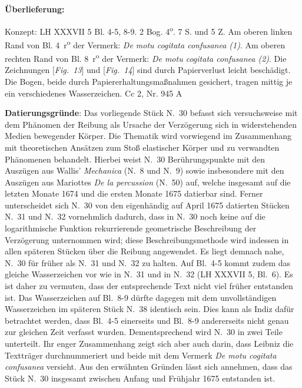 \begin{ledgroupsized}[r]{120mm}
\footnotesize
\pstart
\noindent\textbf{\"{U}berlieferung:}   
\pend
\end{ledgroupsized}
\begin{ledgroupsized}[r]{114mm}
\footnotesize
\pstart
\parindent -6mm
Konzept: LH XXXVII 5 Bl. 4-5, 8-9.
2 Bog. 4\textsuperscript{o}.
7 S. und 5 Z.
Am oberen linken Rand von Bl. 4~r\textsuperscript{o} der Vermerk: \textit{De motu cogitata confusanea (1)}.
Am oberen rechten Rand von Bl. 8~r\textsuperscript{o} der Vermerk: \textit{De motu cogitata confusanea (2)}.
Die Zeichnungen [\textit{Fig.~13}] und [\textit{Fig.~14}] sind durch Papierverlust leicht besch\"{a}digt.
Die Bogen, beide durch Papier\-er\-haltungsma{\ss}nahmen gesichert, tragen mittig je ein verschiedenes Wasserzeichen.%
\newline%
Cc 2, Nr. 945 A%
\pend
\end{ledgroupsized}

\vspace*{5mm}
\begin{ledgroup}
\footnotesize 
\pstart
\noindent\footnotesize{\textbf{Datierungsgr\"{u}nde}: Das vorliegende Stück N.~30 befasst sich versuchsweise mit dem Phänomen der Reibung
als Ursache der Verzögerung sich in widerstehenden Medien bewegender Körper.
Die Thematik wird vorwiegend im Zusammenhang mit theoretischen Ansätzen zum Stoß elastischer Körper
und zu ver\-wandten Phänomenen behandelt.
Hierbei weist N.~30 Berührungspunkte mit den Auszügen aus Wallis' \textit{Mechanica} (N.~8 und N.~9)
sowie insbesondere mit den Auszügen aus Mariottes \textit{De la percussion} (N.~50) auf,
welche insgesamt auf die letzten Monate 1674 und die ersten Monate 1675 datierbar sind.
Ferner unterscheidet sich N.~30 von den eigenhändig auf April 1675 datierten Stücken N.~31 und N.~32 vornehmlich dadurch,
dass in N.~30 noch keine auf die logarithmische Funktion rekurrierende geometrische Beschreibung der %
Verzögerung unternommen wird;
diese Beschreibungsmethode wird indessen in allen späteren Stücken über die Reibung angewendet.
Es liegt demnach nahe, N.~30 für früher als N.~31 und N.~32 zu halten.
Auf Bl.~4-5 kommt zudem das gleiche Wasserzeichen vor wie in N.~31 %
und in N.~32 (LH XXXVII 5, Bl.~6).
Es ist daher zu vermuten, dass der entsprechende Text nicht viel früher entstanden ist.
Das Wasserzeichen auf Bl.~8-9 dürfte dagegen mit dem unvollständigen Wasserzeichen im späteren Stück N.~38 %
identisch sein. Dies kann als Indiz dafür betrachtet werden,
dass Bl.~4-5 einerseits und Bl.~8-9 andererseits nicht genau zur gleichen Zeit verfasst wurden.
Dementsprechend wird N.~30 in zwei Teile unterteilt.
Ihr enger Zusammenhang zeigt sich aber auch darin,
dass Leibniz die Textträger durchnummeriert und beide mit dem Vermerk \textit{De motu cogitata confusanea} versieht.
Aus den erwähnten Gründen lässt sich annehmen,
dass das Stück N.~30 insgesamt zwischen Anfang und Frühjahr 1675 entstanden ist.}
\pend
\end{ledgroup}

